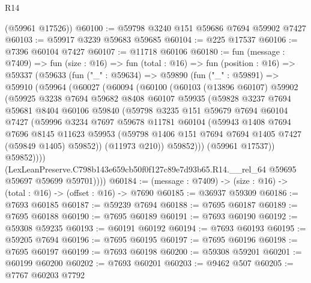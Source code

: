 \begin{lexlean}{R14}
\begin{coremodule}
      (@59961 @17526))
@60100 := @59798 @3240 @151 @59686 @7694 @59902 @7427
@60103 := @59917 @3239 @59683 @59685
@60104 := @225 @17537
@60106 := @7396 @60104 @7427
@60107 := @11718 @60106
@60180 := fun (message : @7409) =>
  fun (size : @16) =>
  fun (total : @16) =>
  fun (position : @16) =>
  @59337
    (@59633
      (fun ("_" : @59634) =>
      @59890
        (fun ("_" : @59891) =>
        @59910
          (@59964
            (@60027
              (@60094
                (@60100
                  (@60103
                    (@13896 @60107)
                    @59902
                    (@59925
                      @3238
                      @7694
                      @59682
                      @8408
                      @60107
                      @59935
                      (@59828
                        @3237
                        @7694
                        @59681
                        @8404
                        @60106
                        @59840
                        (@59798
                          @3235
                          @151
                          @59679
                          @7694
                          @60104
                          @7427
                          (@59996
                            @3234
                            @7697
                            @59678
                            @11781
                            @60104
                            (@59943
                              @1408
                              @7694
                              @7696
                              @8145
                              @11623
                              @59953
                              (@59798 @1406 @151 @7694 @7694 @1405 @7427 (@59849 @1405) @59852))
                            (@11973 @210))
                          @59852)))
                    (@59961 @17537))
                  @59852))))
          (LexLeanPreserve.C798b143e659cb50f0f127c89e7d93b65.R14.__rel_64
            @59695
            @59697
            @59699
            @59701))))
@60184 := (message : @7409) -> (size : @16) -> (total : @16) -> (offset : @16) -> @7690
@60185 := @36937 @59309
@60186 := @7693 @60185
@60187 := @59239 @7694
@60188 := @7695 @60187
@60189 := @7695 @60188
@60190 := @7695 @60189
@60191 := @7693 @60190
@60192 := @59308 @59235
@60193 := @60191 @60192
@60194 := @7693 @60193
@60195 := @59205 @7694
@60196 := @7695 @60195
@60197 := @7695 @60196
@60198 := @7695 @60197
@60199 := @7693 @60198
@60200 := @59308 @59201
@60201 := @60199 @60200
@60202 := @7693 @60201
@60203 := @9462 @507
@60205 := @7767 @60203 @7792

\end{coremodule}
\end{lexlean}
